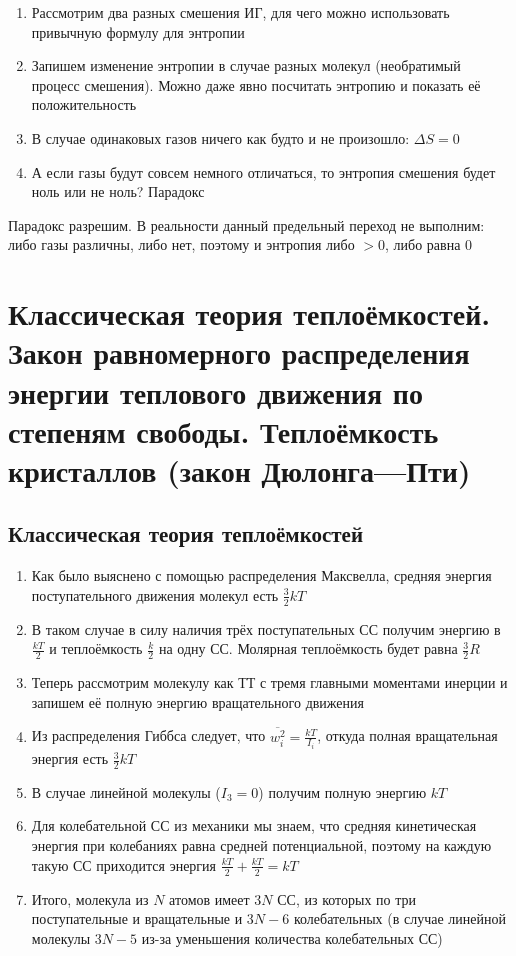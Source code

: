 \documentclass[a4paper, 14pt]{article}
\begin{document}
    \begin{enumerate}
        \item Рассмотрим два разных смешения ИГ, для чего можно использовать привычную формулу для энтропии
        \item Запишем изменение энтропии в случае разных молекул (необратимый процесс смешения).
        Можно даже явно посчитать энтропию и показать её положительность
        \item В случае одинаковых газов ничего как будто и не произошло: $\Delta S = 0$
        \item А если газы будут совсем немного отличаться, то энтропия смешения будет ноль или не ноль?
        Парадокс
    \end{enumerate}
    
    Парадокс разрешим.
    В реальности данный предельный переход не выполним: либо газы различны, либо нет, поэтому и энтропия либо $>0$,
    либо равна $0$
    
    \section{Классическая теория теплоёмкостей.
    Закон равномерного распределения энергии теплового движения по степеням свободы.
    Теплоёмкость кристаллов (закон Дюлонга—Пти)}
    
    \subsection{Классическая теория теплоёмкостей}
    
    \begin{enumerate}
        \item Как было выяснено с помощью распределения Максвелла, средняя энергия поступательного движения молекул
        есть $\frac{3}{2} kT$
        \item В таком случае в силу наличия трёх поступательных СС получим энергию в $\frac{kT}{2}$ и теплоёмкость
        $\frac{k}{2}$ на одну СС.
        Молярная теплоёмкость будет равна $\frac{3}{2}R$
        \item Теперь рассмотрим молекулу как ТТ с тремя главными моментами инерции и запишем её полную энергию
        вращательного движения
        \item Из распределения Гиббса следует, что $\overline{w^2_i} = \frac{kT}{I_i}$, откуда полная вращательная
        энергия есть $\frac{3}{2} kT$
        \item В случае линейной молекулы ($I_3 = 0$) получим полную энергию $kT$
        \item Для колебательной СС из механики мы знаем, что средняя кинетическая энергия при колебаниях равна
        средней потенциальной, поэтому на каждую такую СС приходится энергия $\frac{kT}{2} + \frac{kT}{2} = kT$
        \item Итого, молекула из $N$ атомов имеет $3N$ СС, из которых по три поступательные и вращательные и $3N - 6$
        колебательных (в случае линейной молекулы $3N - 5$ из-за уменьшения количества колебательных СС)
    \end{enumerate}
    
\end{document}
